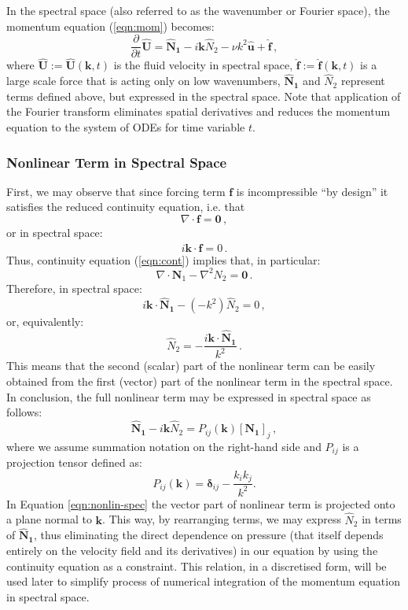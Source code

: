 \documentclass{pracamgren}
\begin{document}
In the spectral space (also referred to as the wavenumber or Fourier space), the momentum equation (\ref{eqn:mom}) becomes:
\begin{equation}
\label{eqn:mom-spec}
\frac{\partial}{\partial t} \mathbf{\hat{U}} = \mathbf{\hat{N}_1} - i \mathbf{k} \hat{N}_2 - \nu k^2 \mathbf{\hat{u}} + \mathbf{\hat{f}} \, ,
\end{equation}
where $\mathbf{\hat{U}} := \mathbf{\hat{U}}(\mathbf{k}, t)$ is the fluid velocity in spectral space, $\mathbf{\hat{f}} := \mathbf{\hat{f}}(\mathbf{k}, t)$ is a large scale force that is acting only on low wavenumbers, $\mathbf{\hat{N}_1}$ and $\hat{N}_2$ represent terms defined above, but expressed in the spectral space.
Note that application of the Fourier transform eliminates spatial derivatives and reduces the momentum equation to the system of ODEs for time variable $t$. 

\subsubsection{Nonlinear Term in Spectral Space}

First, we may observe that since forcing term $\mathbf{f}$ is incompressible ``by design'' it satisfies the reduced continuity equation, i.e. that
$$ \nabla \cdot \mathbf{f} = \mathbf{0} \, , $$
or in spectral space:
$$ i \mathbf{k} \cdot \mathbf{\hat{f}} = 0 \, . $$
Thus, continuity equation (\ref{eqn:cont}) implies that, in particular:
$$ \nabla \cdot \mathbf{N}_1 - \nabla^2 N_2 = \mathbf{0} \, . $$
Therefore, in spectral space:
$$ i \mathbf{k} \cdot \mathbf{\hat{N}_1} - (-k^2) \hat{N}_2 = 0 \, , $$
or, equivalently:
$$ \hat{N}_2 = - \frac{i \mathbf{k} \cdot \mathbf{\hat{N}_1} }{k^2} \,. $$
This means that the second (scalar) part of the nonlinear term can be easily obtained from the first (vector) part of the nonlinear term in the spectral space.
In conclusion, the full nonlinear term may be expressed in spectral space as follows:
\begin{equation}
\label{eqn:nonlin-spec}
\mathbf{\hat{N}_1} - i \mathbf{k} \hat{N}_2 = P_{ij}( \mathbf{k} ) \left[ \mathbf{N_1} \right]_{j} \, ,
\end{equation}
where we assume summation notation on the right-hand side and $P_{ij}$ is a projection tensor defined as:
\begin{equation}
\label{eqn:proj-tensor}
P_{ij}( \mathbf{k} ) = \mathbf{\delta}_{ij} - \frac{k_{i} k_{j}}{k^2} .
\end{equation}
In Equation \ref{eqn:nonlin-spec} the vector part of nonlinear term is projected onto a plane normal to $\mathbf{k}$.
This way, by rearranging terms, we may express $\hat{N}_2$ in terms of $\mathbf{\hat{N}_1}$, thus eliminating the direct dependence on pressure (that itself depends entirely on the velocity field and its derivatives) in our equation by using the continuity equation as a constraint. 
This relation, in a discretised form, will be used later to simplify process of numerical integration of the momentum equation in spectral space.
\end{document}
